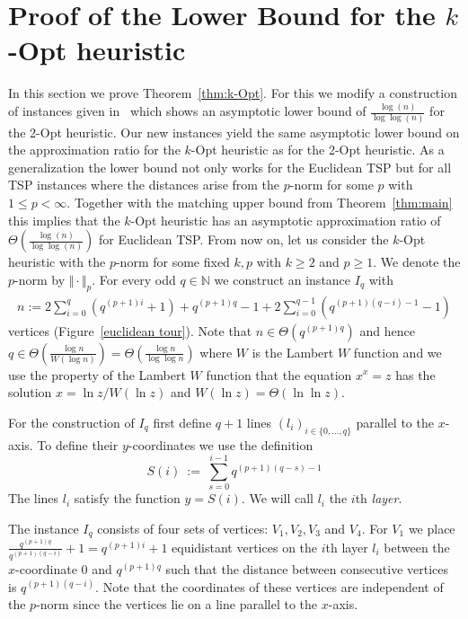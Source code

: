 \documentclass[a4paper, 11pt]{article}
\def\blue#1{#1}
\begin{document}
\section{Proof of the Lower Bound for the \texorpdfstring{$k$}{k}-Opt heuristic} \label{sec:lower-bound}
In this section we prove Theorem~\ref{thm:k-Opt}. For this we modify a construction of instances given in~\cite{CKT1999} which shows an asymptotic lower bound of $\frac{\log(n)}{\log\log(n)}$ for the 2-Opt heuristic. Our new instances yield the same asymptotic lower bound on the approximation ratio for the $k$-Opt heuristic as for the 2-Opt heuristic. As a generalization the lower bound not only works for the Euclidean TSP but for all TSP instances where the distances arise from the 
$p$-norm for some $p$ \blue{with $1\le p < \infty$}. Together with the matching upper bound from Theorem~\ref{thm:main} this implies that the $k$-Opt heuristic has an asymptotic approximation ratio of $\Theta\left(\frac{\log(n)}{\log\log(n)}\right)$ for Euclidean TSP. From now on, let us consider the $k$-Opt heuristic with the $p$-norm for some fixed $k,p$ with $k\geq 2$ and $p\geq 1$. We denote the $p$-norm by $\Vert \cdot\Vert_p$.
For every odd $q\in \mathbb{N}$ we construct an instance $I_q$ with 
\begin{align*}
n:=2\sum_{i=0}^q (q^{(p+1)i}+1)+q^{(p+1)q}-1+2\sum_{i=0}^{q-1} (q^{(p+1)(q-i)-1}-1)
\end{align*}
vertices (Figure~\ref{euclidean tour}). Note that $n\in\Theta\left(q^{(p+1)q}\right)$ and hence $q\in\Theta\left(\frac{\log n}{W(\log n)}\right)=\Theta\left(\frac{\log n}{\log \log n}\right)$ where $W$ is the Lambert $W$ function and we use the property of the Lambert $W$ function that the equation $x^x=z$ has the solution $x = \ln z /W(\ln z)$ and $W(\ln z) = \Theta(\ln \ln z)$. 

For the construction of $I_q$ first define $q+1$ lines $(l_i)_{i\in \{0,\dots, q\}}$ parallel to the $x$-axis. To define their $y$-coordinates we
use the definition
\begin{equation}
S(i) ~:=~ \sum_{s=0}^{i-1} q^{(p+1)(q-s)-1}
\end{equation}
The lines $l_i$ satisfy the function $y=S(i)$.  We will call $l_i$ the $i$th \emph{layer}.

The instance $I_q$ consists of four sets of vertices: $V_1,V_2,V_3$ and $V_4$.
For $V_1$ we place $\frac{q^{(p+1)q}}{q^{(p+1)(q-i)}}+1=q^{(p+1)i}+1$ equidistant vertices on the $i$th layer $l_i$ between the $x$-coordinate 0 and $q^{(p+1)q}$ such that the distance between consecutive vertices is $q^{(p+1)(q-i)}$. Note that the coordinates of these vertices are independent of the $p$-norm since the vertices lie on a line parallel to the $x$-axis.
\end{document}
